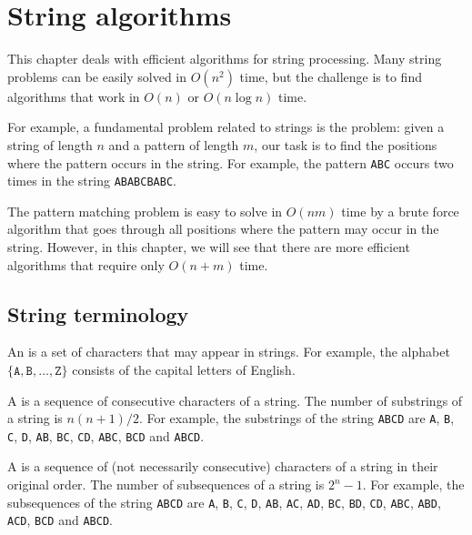 \chapter{String algorithms}

This chapter deals with efficient algorithms
for string processing.
Many string problems can be easily solved
in $O(n^2)$ time, but the challenge is to
find algorithms that work in $O(n)$ or $O(n \log n)$
time.


For example, a fundamental problem related to strings
is the  problem:
given a string of length $n$ and a pattern of length $m$,
our task is to find the positions where the pattern
occurs in the string.
For example, the pattern \texttt{ABC} occurs two
times in the string \texttt{ABABCBABC}.

The pattern matching problem is easy to solve
in $O(nm)$ time by a brute force algorithm that
goes through all positions where the pattern may
occur in the string.
However, in this chapter, we will see that there
are more efficient algorithms that require only
$O(n+m)$ time.


\section{String terminology}


An  is a set of characters
that may appear in strings.
For example, the alphabet
$\{\texttt{A},\texttt{B},\ldots,\texttt{Z}\}$
consists of the capital letters of English.


A  is a sequence of consecutive
characters of a string.
The number of substrings of a string is $n(n+1)/2$.
For example, the substrings of the string
\texttt{ABCD} are
\texttt{A}, \texttt{B}, \texttt{C}, \texttt{D},
\texttt{AB}, \texttt{BC}, \texttt{CD},
\texttt{ABC}, \texttt{BCD} and \texttt{ABCD}.


A  is a sequence of
(not necessarily consecutive) characters
of a string in their original order.
The number of subsequences of a string is $2^n-1$.
For example, the subsequences of the string
\texttt{ABCD} are
\texttt{A}, \texttt{B}, \texttt{C}, \texttt{D},
\texttt{AB}, \texttt{AC}, \texttt{AD},
\texttt{BC}, \texttt{BD}, \texttt{CD},
\texttt{ABC}, \texttt{ABD}, \texttt{ACD},
\texttt{BCD} and \texttt{ABCD}.

